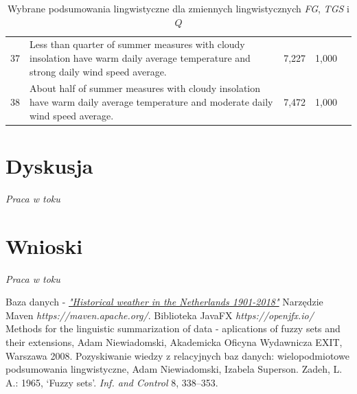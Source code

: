 \documentclass{classrep}
\begin{document}
\begin{table}[H]
\begin{center}
\begin{tabularx}{\linewidth}{ |c|X|c|c|c| }
37	&	Less than quarter of summer measures with cloudy insolation have warm daily average temperature and strong daily wind speed average.	&	7,227	&	1,000	& \\	\cline{1-4}
38	&	About half of summer measures with cloudy insolation have warm daily average temperature and moderate daily wind speed average.	&	7,472	&	1,000	& \\
\hline
\end{tabularx}
\caption{Wybrane podsumowania lingwistyczne dla zmiennych lingwistycznych \textit{FG}, \textit{TGS} i $Q$}
\end{center}
\end{table}

\clearpage


\section{Dyskusja}
\textit{Praca w toku}


\section{Wnioski}
\textit{Praca w toku}


\begin{thebibliography}{5}
Baza danych - 
\href{https://www.kaggle.com/sinaasappel/historical-weather-in-the-netherlands-19012018}{\textit{"Historical weather in the Netherlands 1901-2018"}}
Narzędzie Maven\newline
\textit{https://maven.apache.org/}. 
Biblioteka JavaFX\newline
\textit{https://openjfx.io/}
Methods for the linguistic summarization of data - aplications of fuzzy sets and their extensions, Adam Niewiadomski, Akademicka Oficyna Wydawnicza EXIT, Warszawa 2008.
Pozyskiwanie wiedzy z relacyjnych baz danych: wielopodmiotowe podsumowania lingwistyczne, Adam Niewiadomski, Izabela Superson.
Zadeh, L. A.: 1965, ‘Fuzzy sets’.  \textit{Inf. and Control} 8, 338–353.
\end{thebibliography}
\end{document}
